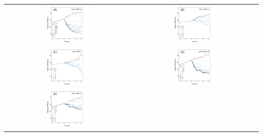 \documentclass{article}
\begin{document}


\begin{center}
\centering
\begin{tabularx}{1\textwidth}{cc}
\includegraphics[trim = 0mm 0mm 0mm 0mm, clip,width=0.35\textwidth]{WHOG_CIPregression} &
\includegraphics[trim = 0mm 0mm 0mm 0mm, clip,width=0.35\textwidth]{WHOK_CIPregression}\\    
\includegraphics[trim = 0mm 0mm 0mm 0mm, clip,width=0.35\textwidth]{WHOL_CIPregression} &  
\includegraphics[trim = 0mm 0mm 0mm 0mm, clip,width=0.35\textwidth]{WHOM_CIPregression}   \\
\includegraphics[trim = 0mm 0mm 0mm 0mm, clip,width=0.35\textwidth]{WHON_CIPregression} & 

\end{tabularx}
\end{center}
\end{document}
